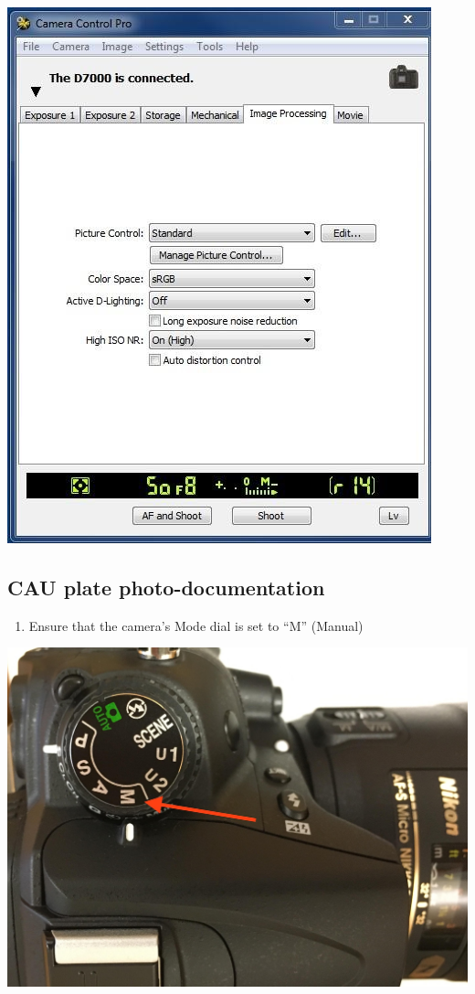 \documentclass[]{book}
\providecommand{\tightlist}{%
  \setlength{\itemsep}{0pt}\setlength{\parskip}{0pt}}
\begin{document}
\includegraphics{images/Camera6.jpg}

\hypertarget{cau-plate-photo-documentation}{%
\subsection{CAU plate photo-documentation}\label{cau-plate-photo-documentation}}

\begin{enumerate}
\def\labelenumi{\arabic{enumi}.}
\tightlist
\item
  Ensure that the camera's Mode dial is set to ``M'' (Manual)
\end{enumerate}

\includegraphics{images/Camera7.jpg}
\end{document}
